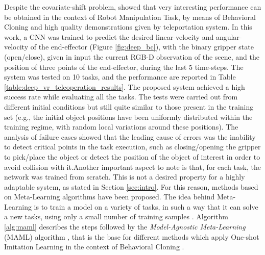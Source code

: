 Despite the covariate-shift problem, \cite{zhang2018deep_vr_teleoperation} showed that very interesting performance can be obtained in the context of Robot Manipulation Task, by means of Behavioral Cloning and high quality demonstrations given by teleportation system. In this work, a CNN was trained to predict the desired linear-velocity and angular-velocity of the end-effector (Figure \ref{fig:deep_bc}), with the binary gripper state (open/close), given in input the current RGB-D observation of the scene, and the position of three points of the end-effector, during the last 5 time-steps. The system was tested on 10 tasks, and the performance are reported in Table \ref{table:deep_vr_teleoperation_results}. The proposed system achieved a high success rate while evaluating all the tasks. The tests were carried out from different initial conditions but still quite similar to those present in the training set (e.g., the initial object positions have been uniformly distributed within the training regime, with random local variations around these positions). The analysis of failure cases showed that the leading cause of errors was the inability to detect critical points in the task execution, such as closing/opening the gripper to pick/place the object or detect the position of the object of interest in order to avoid collision with it.\unskip Another important aspect to note is that, for each task, the network was trained from scratch. This is not a desired property for a highly adaptable system, as stated in Section \ref{sec:intro}. For this reason, methods based on Meta-Learning algorithms have been proposed. The idea behind Meta-Learning is to train a model on a variety of tasks, in such a way that it can solve a new tasks, using only a small number of training samples \cite{finn2017maml}. Algorithm \ref{alg:maml} describes the steps followed by the \textit{Model-Agnostic Meta-Learning} (MAML) algorithm \cite{finn2017maml}, that is the base for different methods which apply One-shot Imitation Learning in the context of Behavioral Cloning \cite{finn2017one_shot_visual_il,yu2018daml,yu2018one_shot_hil}.
